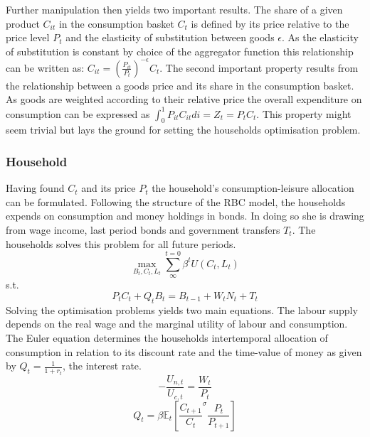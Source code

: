 \documentclass[12pt,a4paper,english]{article} %
\newcommand{\E}{\mathbb{E}} %
\begin{document}
	Further manipulation then yields two important results. The share of a given product $C_{it}$ in the consumption basket $C_t$ is defined by its price relative to the price level $P_t$ and the elasticity of substitution between goods $\epsilon$. As the elasticity of substitution is constant by choice of the aggregator function this relationship can be written as: $C_{it} = \left( \frac{P_{it}}{P_t} \right)^{- \epsilon} C_t$. The second important property results from the relationship between a goods price and its share in the consumption basket. As goods are weighted according to their relative price the overall expenditure on consumption can be expressed as $\int_{0}^{1} P_{it} C_{it} di = Z_t = P_t C_t$. This property might seem trivial but lays the ground for setting the households optimisation problem. 
	
	\subsubsection{Household}
	Having found $C_t$ and its price $P_t$ the household's consumption-leisure allocation can be formulated. Following the structure of the RBC model, the households expends on consumption and money holdings in bonds. In doing so she is drawing from wage income, last period bonds and government transfers $T_t$. The households solves this problem for all future periods.
	\[
		\max_{B_t, C_t, L_t} \sum_{\infty}^{t=0} \beta^{t} U(C_{t}, L_{t})
	\]
	s.t.
	\[
		P_t C_t + Q_t B_t = B_{t-1} + W_t N_t + T_t
	\]
	Solving the optimisation problems yields two main equations. The labour supply depends on the real wage and the marginal utility of labour and consumption. The Euler equation determines the households intertemporal allocation of consumption in relation to its discount rate and the time-value of money as given by $Q_t = \frac{1}{1+r_t}$, the interest rate.
	\[
		- \frac{U_{n,t}}{U_{c, t}} = \frac{W_t}{P_t}
	\]
	\[
		Q_t = \beta \E_t \left[
						\frac{C_{t+1}}{C_t}^\sigma \frac{P_t}{P_{t+1}}
					\right] 
	\]
\end{document}
